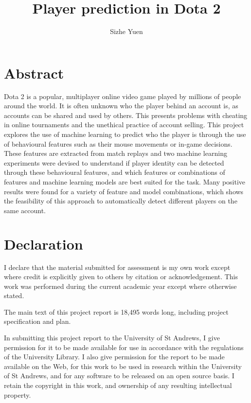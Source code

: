 \documentclass{sty/SizheArticle}
\title{Player prediction in Dota 2}
\author{Sizhe Yuen}
\begin{document}

\newpage
{}


\section*{Abstract}
Dota 2 is a popular, multiplayer online video game played by millions of people around the world. It is often unknown who the player behind an account is, as accounts can be shared and used by others. This presents problems with cheating in online tournaments and the unethical practice of account selling. This project explores the use of machine learning to predict who the player is through the use of behavioural features such as their mouse movements or in-game decisions. These features are extracted from match replays and two machine learning experiments were devised to understand if player identity can be detected through these behavioural features, and which features or combinations of features and machine learning models are best suited for the task. Many positive results were found for a variety of feature and model combinations, which shows the feasibility of this approach to automatically detect different players on the same account. 


\section*{Declaration}
I declare that the material submitted for assessment is my own work except where credit is explicitly given to others by citation or acknowledgement. This work was performed during the current academic year except where otherwise stated.

The main text of this project report is 18,495 words long, including project specification and plan.

In submitting this project report to the University of St Andrews, I give permission for it to be made available for use in accordance with the regulations of the University Library. I also give permission for the report to be made available on the Web, for this work to be used in research within the University of St Andrews, and for any software to be released on an open source basis. I retain the copyright in this work, and ownership of any resulting intellectual property.
\end{document}
